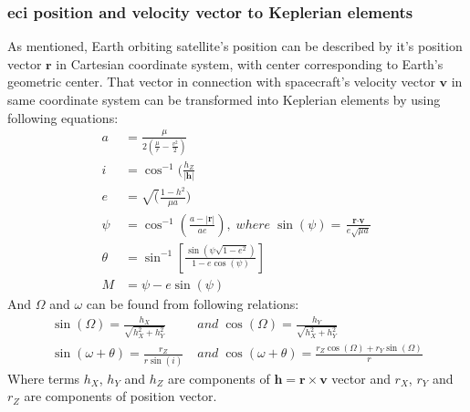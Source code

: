         
        \subsubsection{\ac{eci} position and velocity vector to Keplerian elements}
            As mentioned, Earth orbiting satellite's position can be described by it's position vector $\textbf{r}$ in Cartesian coordinate system, with center corresponding to Earth's geometric center. That vector in connection with spacecraft's velocity vector $\textbf{v}$ in same coordinate system can be transformed into Keplerian elements by using following equations:
            \begin{align}
                a &= \frac{\mu}{2\left(\frac{\mu}{r}-\frac{v^2}{2}\right)} \\
                i &= \cos^{-1}(\frac{h_Z}{|\textbf{h}|} \\
                e &= \sqrt(\frac{1-h^2}{\mu a}) \\
                \psi &= \cos^{-1}\left(\frac{a-|\textbf{r}|}{ae}\right), \; where \; \sin(\psi) = \frac{\textbf{r}\cdot\textbf{v}}{e\sqrt{\mu a}} \\
                \theta &= \sin^{-1}\left[\frac{\sin(\psi \sqrt{1-e^2})}{1-e\cos(\psi)}\right] \\
                M & = \psi - e\sin(\psi)
            \end{align}
            And $\Omega$ and $\omega$ can be found from following relations:
            \begin{align}
                \sin(\Omega) = \frac{h_X}{\sqrt{h^2_X+h^2_Y}}\; & and\; \cos(\Omega) = \frac{h_Y}{\sqrt{h^2_X+h^2_Y}} \\
                \sin(\omega+\theta) = \frac{r_Z}{r\sin(i)}\; & and\; \cos(\omega+\theta) = \frac{r_Z\cos(\Omega)+r_Y\sin(\Omega)}{r}
            \end{align}
            Where terms $h_X$, $h_Y$ and $h_Z$ are components of $\textbf{h}=\textbf{r}\times \textbf{v}$ vector and $r_X$, $r_Y$ and $r_Z$ are components of position vector.
        
